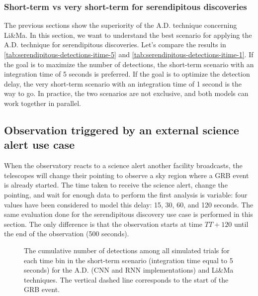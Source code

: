 \subsubsection{Short-term vs very short-term for serendipitous discoveries}
\label{s:serendipitous-short-term-vs-very-short-term}
The previous sections show the superiority of the A.D. technique concerning Li\&Ma. In this section, we want to understand the best scenario for applying the A.D. technique for serendipitous discoveries. Let's compare the results in \autoref{tab:serendipitous-detections-itime-5} and \autoref{tab:serendipitous-detections-itime-1}. If the goal is to maximize the number of detections, the short-term scenario with an integration time of 5 seconds is preferred. If the goal is to optimize the detection delay, the very short-term scenario with an integration time of 1 second is the way to go. In practice, the two scenarios are not exclusive, and both models can work together in parallel. 


\subsection{Observation triggered by an external science alert use case}
\label{s:Science-Alert-Results}

When the observatory reacts to a science alert another facility broadcasts, the telescopes will change their pointing to observe a sky region where a GRB event is already started. The time taken to receive the science alert, change the pointing, and wait for enough data to perform the first analysis is variable: four values have been considered to model this delay: 15, 30, 60, and 120 seconds. The same evaluation done for the serendipitous discovery use case is performed in this section. The only difference is that the observation starts at time $TT+120$ until the end of the observation (500 seconds).

\begin{figure}[ht] %
\centering

\caption{The cumulative number of detections among all simulated trials for each time bin in the short-term scenario (integration time equal to 5 seconds) for the A.D. (CNN and RNN implementations) and Li\&Ma techniques. The vertical dashed line corresponds to the start of the GRB event.}
\label{f:cumulative-detections-science-alert-itime-5}
\end{figure}

